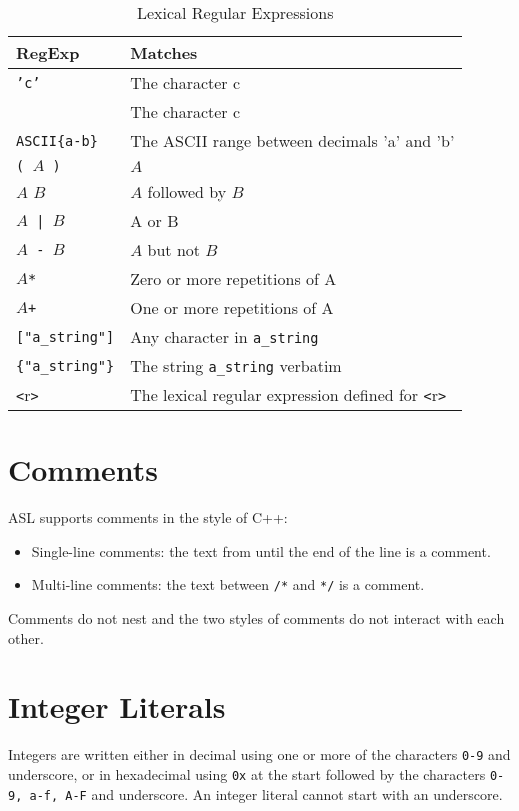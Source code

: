 \documentclass{book}
\newcommand\Char[1]{\fbox{#1}}
\begin{document}
\begin{table}
\caption{Lexical Regular Expressions \label{ta:LexicalRegularExpressions}}
\begin{center}
\begin{tabular}{ll}
\hline
\textbf{RegExp} & \textbf{Matches}\\
\hline
\texttt{'c'}              & The character c\\
\Char{c}                  & The character c\\
\texttt{ASCII\{a-b\}}       & The ASCII range between decimals 'a' and 'b'\\
\texttt{( $A$ )}          & $A$\\
$A$ $B$                   & $A$ followed by $B$\\
\texttt{$A$ | $B$}        & A or B\\
\texttt{$A$ - $B$}        & $A$ but not $B$\\
\texttt{$A$*}             & Zero or more repetitions of A\\
\texttt{$A$+}             & One or more repetitions of A\\
\texttt{["a\_string"]}    & Any character in \texttt{a\_string}\\
\texttt{\{"a\_string"\}}  & The string \texttt{a\_string} verbatim\\
\texttt{<}r\texttt{>}     & The lexical regular expression defined for \texttt{<}r\texttt{>}\\
\hline
\end{tabular}
\end{center}
\end{table}

\section{Comments}
ASL supports comments in the style of C++:
\begin{itemize}
\item Single-line comments: the text from \text{//} until the end of the line
is a comment.
\item Multi-line comments: the text between \texttt{/*} and \texttt{*/} is a comment.
\end{itemize}
Comments do not nest and the two styles of comments do not interact with each other.

\section{Integer Literals}
Integers are written either in decimal using one or more of the characters \texttt{0-9} and underscore, or in hexadecimal
using \texttt{0x} at the start followed by the characters \texttt{0-9, a-f, A-F} and underscore. An integer literal cannot start with
an underscore.
\end{document}
